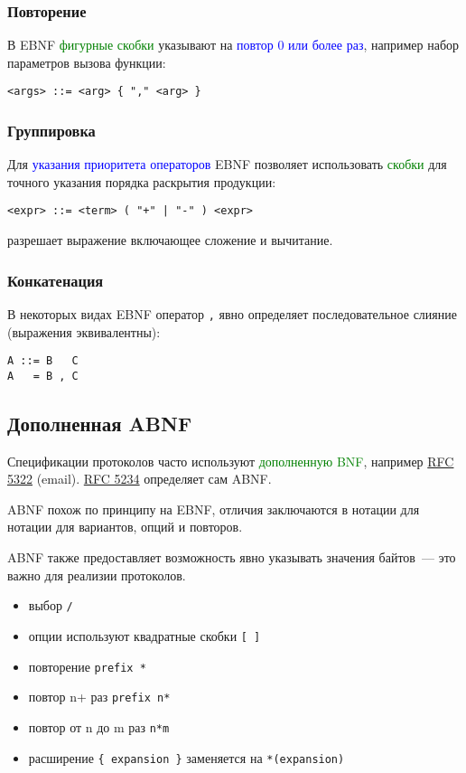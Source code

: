 \documentclass[oneside,10pt]{article}
\renewcommand{\emph}[1]{\textcolor{blue}{#1}}
\newcommand{\term}[1]{\textcolor{green}{#1}}
\begin{document}
\subsubsection{Повторение}

В EBNF \term{фигурные скобки} указывают на \emph{повтор 0 или более раз},
например набор параметров вызова функции:
\begin{verbatim}
<args> ::= <arg> { "," <arg> }
\end{verbatim}

\subsubsection{Группировка}

Для \emph{указания приоритета операторов} EBNF позволяет использовать
\term{скобки} для точного указания порядка раскрытия продукции:
\begin{verbatim}
<expr> ::= <term> ( "+" | "-" ) <expr>
\end{verbatim}
разрешает выражение включающее сложение и вычитание.

\subsubsection{Конкатенация}

В некоторых видах EBNF оператор \verb|,| явно определяет последовательное
слияние (выражения эквивалентны):
\begin{verbatim}
A ::= B   C
A   = B , C
\end{verbatim}

\subsection{Дополненная ABNF}

Спецификации протоколов часто используют \term{дополненную BNF},
например \href{http://tools.ietf.org/html/rfc5322#section-1.2}{RFC 5322}
(email). \href{http://tools.ietf.org/html/rfc5234}{RFC 5234} определяет сам
ABNF.
\bigskip

ABNF похож по принципу на EBNF, отличия заключаются в нотации для
нотации для вариантов, опций и повторов.

ABNF также предоставляет возможность явно указывать значения байтов\ --- это
важно для реализии протоколов.

\begin{itemize}[nosep]
  \item выбор \verb|/|
  \item опции используют квадратные скобки \verb|[ ]|
  \item повторение \verb|prefix *|
  \item повтор n+ раз \verb|prefix n*|
  \item повтор от n до m раз \verb|n*m|
  \item расширение \verb|{ expansion }| заменяется на \verb|*(expansion)|
\end{itemize}
\end{document}
